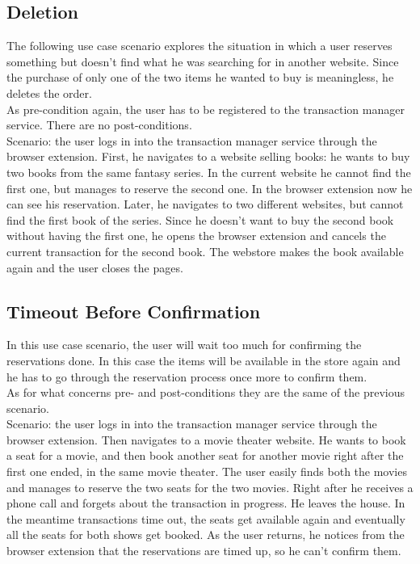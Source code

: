 \subsection{Deletion}
The following use case scenario explores the situation in which a user reserves something but doesn't find what he was searching for in another website. Since the purchase of only one of the two items he wanted to buy is meaningless, he deletes the order.\\
As pre-condition again, the user has to be registered to the transaction manager service. There are no post-conditions.\\
Scenario: the user logs in into the transaction manager service through the browser extension. First, he navigates to a website selling books: he wants to buy two books from the same fantasy series. In the current website he cannot find the first one, but manages to reserve the second one. In the browser extension now he can see his reservation. Later, he navigates to two different websites, but cannot find the first book of the series. Since he doesn't want to buy the second book without having the first one, he opens the browser extension and cancels the current transaction for the second book. The webstore makes the book available again and the user closes the pages.\\

\subsection{Timeout Before Confirmation}
In this use case scenario, the user will wait too much for confirming the reservations done. In this case the items will be available in the store again and he has to go through the reservation process once more to confirm them.\\
As for what concerns pre- and post-conditions they are the same of the previous scenario.\\
Scenario: the user logs in into the transaction manager service through the browser extension. Then navigates to a movie theater website. He wants to book a seat for a movie, and then book another seat for another movie right after the first one ended, in the same movie theater. The user easily finds both the movies and manages to reserve the two seats for the two movies. Right after he receives a phone call and forgets about the transaction in progress. He leaves the house. In the meantime transactions time out, the seats get available again and eventually all the seats for both shows get booked. As the user returns, he notices from the browser extension that the reservations are timed up, so he can't confirm them.

